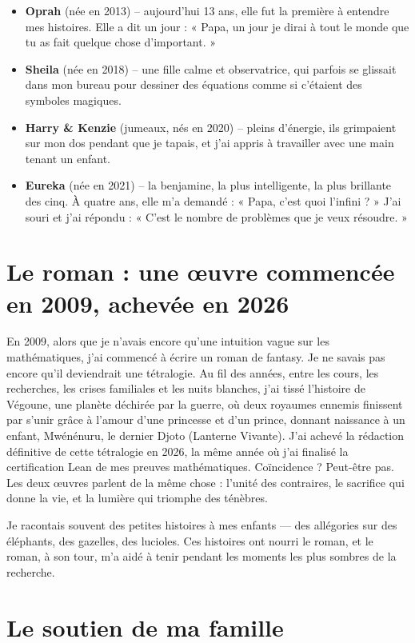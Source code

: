 \documentclass[11pt,a4paper]{article}
\begin{document}
\begin{itemize}
\item \textbf{Oprah} (née en 2013) – aujourd'hui 13 ans, elle fut la première à entendre mes histoires. Elle a dit un jour : « Papa, un jour je dirai à tout le monde que tu as fait quelque chose d'important. »
\item \textbf{Sheila} (née en 2018) – une fille calme et observatrice, qui parfois se glissait dans mon bureau pour dessiner des équations comme si c'étaient des symboles magiques.
\item \textbf{Harry \& Kenzie} (jumeaux, nés en 2020) – pleins d'énergie, ils grimpaient sur mon dos pendant que je tapais, et j'ai appris à travailler avec une main tenant un enfant.
\item \textbf{Eureka} (née en 2021) – la benjamine, la plus intelligente, la plus brillante des cinq. À quatre ans, elle m'a demandé : « Papa, c'est quoi l'infini ? » J'ai souri et j'ai répondu : « C'est le nombre de problèmes que je veux résoudre. »
\end{itemize}

\section{Le roman : une œuvre commencée en 2009, achevée en 2026}

En 2009, alors que je n'avais encore qu'une intuition vague sur les mathématiques, j'ai commencé à écrire un roman de fantasy. Je ne savais pas encore qu'il deviendrait une tétralogie. Au fil des années, entre les cours, les recherches, les crises familiales et les nuits blanches, j'ai tissé l'histoire de Végoune, une planète déchirée par la guerre, où deux royaumes ennemis finissent par s'unir grâce à l'amour d'une princesse et d'un prince, donnant naissance à un enfant, Mwénénuru, le dernier Djoto (Lanterne Vivante). J'ai achevé la rédaction définitive de cette tétralogie en 2026, la même année où j'ai finalisé la certification Lean de mes preuves mathématiques. Coïncidence ? Peut-être pas. Les deux œuvres parlent de la même chose : l'unité des contraires, le sacrifice qui donne la vie, et la lumière qui triomphe des ténèbres.

Je racontais souvent des petites histoires à mes enfants — des allégories sur des éléphants, des gazelles, des lucioles. Ces histoires ont nourri le roman, et le roman, à son tour, m'a aidé à tenir pendant les moments les plus sombres de la recherche.

\section{Le soutien de ma famille}
\end{document}
